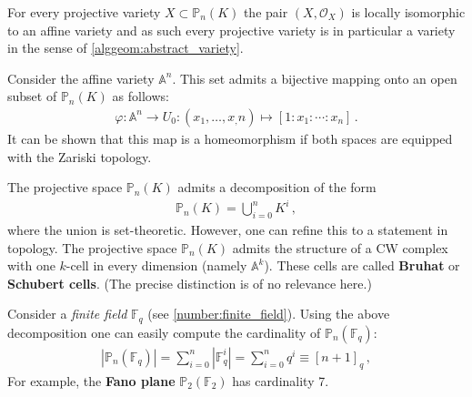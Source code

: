     \begin{property}[Variety]
        For every projective variety $X\subset\mathbb{P}_n(K)$ the pair $(X, \mathcal{O}_X)$ is locally isomorphic to an affine variety and as such every projective variety is in particular a variety in the sense of \cref{alggeom:abstract_variety}.
    \end{property}
    \begin{property}
        Consider the affine variety $\mathbb{A}^n$. This set admits a bijective mapping onto an open subset of $\mathbb{P}_n(K)$ as follows:
        \begin{gather}
            \varphi:\mathbb{A}^n\rightarrow U_0:(x_1,\ldots,x_,n)\mapsto[1:x_1:\cdots:x_n]\,.
        \end{gather}
        It can be shown that this map is a homeomorphism if both spaces are equipped with the Zariski topology.
    \end{property}

    \begin{property}
        The projective space $\mathbb{P}_n(K)$ admits a decomposition of the form
        \begin{gather}
            \mathbb{P}_n(K) = \bigcup_{i=0}^nK^i\,,
        \end{gather}
        where the union is set-theoretic. However, one can refine this to a statement in topology. The projective space $\mathbb{P}_n(K)$ admits the structure of a CW complex with one $k$-cell in every dimension (namely $\mathbb{A}^k$). These cells are called \textbf{Bruhat} or \textbf{Schubert cells}. (The precise distinction is of no relevance here.)
    \end{property}

    \begin{example}
        Consider a \textit{finite field} $\mathbb{F}_q$ (see \cref{number:finite_field}). Using the above decomposition one can easily compute the cardinality of $\mathbb{P}_n(\mathbb{F}_q)$:
        \begin{gather}
            |\mathbb{P}_n(\mathbb{F}_q)| = \sum_{i=0}^n|\mathbb{F}_q^i| = \sum_{i=0}^nq^i \equiv [n+1]_q\,,
        \end{gather}
        For example, the \textbf{Fano plane} $\mathbb{P}_2(\mathbb{F}_2)$ has cardinality 7.
    \end{example}

